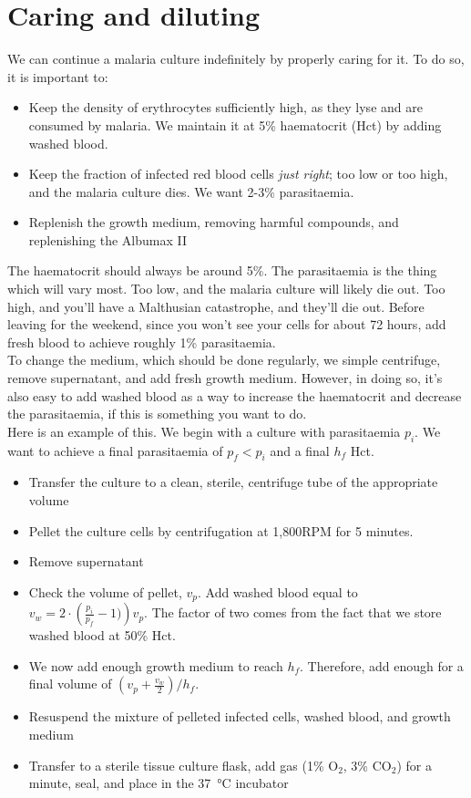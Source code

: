 \documentclass{article}
\begin{document}
\newpage
\section{Caring and diluting}

We can continue a malaria culture indefinitely by properly caring for it. To do so, it is important to:

\begin{itemize}
	\item Keep the density of erythrocytes sufficiently high, as they lyse and are consumed by malaria. We maintain it at 5\% haematocrit (Hct) by adding washed blood.
	\item Keep the fraction of infected red blood cells \emph{just right}; too low or too high, and the malaria culture dies. We want 2-3\% parasitaemia.
	\item Replenish the growth medium, removing harmful compounds, and replenishing the Albumax II
\end{itemize}

The haematocrit should always be around 5\%. The parasitaemia is the thing which will vary most. Too low, and the malaria culture will likely die out. Too high, and you'll have a Malthusian catastrophe, and they'll die out. Before leaving for the weekend, since you won't see your cells for about 72 hours, add fresh blood to achieve roughly 1\% parasitaemia.\\

To change the medium, which should be done regularly, we simple centrifuge, remove supernatant, and add fresh growth medium. However, in doing so, it's also easy to add washed blood as a way to increase the haematocrit and decrease the parasitaemia, if this is something you want to do.\\

Here is an example of this. We begin with a culture with parasitaemia $p_i$. We want to achieve a final parasitaemia of $p_f < p_i$ and a final $h_f$ Hct.

\begin{itemize}
	\item Transfer the culture to a clean, sterile, centrifuge tube of the appropriate volume
	\item Pellet the culture cells by centrifugation at 1,800RPM for 5 minutes.
	\item Remove supernatant
	\item Check the volume of pellet, $v_p$. Add washed blood equal to $v_w = 2 \cdot \left( \tfrac{p_i}{p_f} - 1) \right) v_p$. The factor of two comes from the fact that we store washed blood at 50\% Hct.
	\item We now add enough growth medium to reach $h_f$. Therefore, add enough for a final volume of $(v_p + \tfrac{v_w}{2})/h_f$.
	\item Resuspend the mixture of pelleted infected cells, washed blood, and growth medium
	\item Transfer to a sterile tissue culture flask, add gas (1\% O$_2$, 3\% CO$_2$) for a minute, seal, and place in the \SI{37}{\celsius} incubator
\end{itemize}
\end{document}
